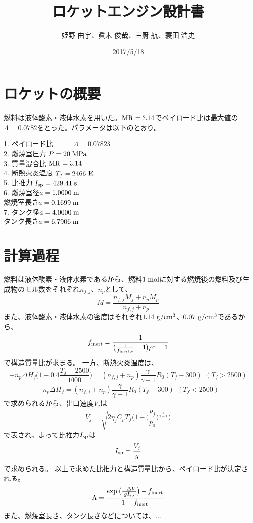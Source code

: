 \documentclass{jsarticle}
\begin{document}
\begin{titlepage}
\title{ロケットエンジン設計書}
\date{2017/5/18}
\author{姫野 由宇、眞木 俊哉、三厨 航、蓑田 浩史}
\maketitle
\thispagestyle{empty}
\end{titlepage}




\section{ロケットの概要}
燃料は液体酸素・液体水素を用いた。$\rm{MR}=3.14$でペイロード比は最大値の$\Lambda = 0.0782$をとった。パラメータは以下のとおり。

\begin{tabbing} 
1. \=ペイロード比 ~~~~ \= $\Lambda = 0.07823$\\

2. \>燃焼室圧力 \> $P = 20 ~\rm{MPa}$\\

3. \>質量混合比 \>$\rm{MR}=3.14$\\

4. \>断熱火炎温度 \>$T_f = 2466 ~ \rm{K}$\\

5. \>比推力 \>$I_{\rm{sp}}= 429.41~\rm{s}$\\

6. \>燃焼室径\>$a = 1.0000 ~ \rm{m}$\\

\>燃焼室長さ\>$a = 0.1699 ~ \rm{m}$\\

7. \>タンク径\>$a = 4.0000 ~ \rm{m}$\\

\>タンク長さ\>$a = 6.7906 ~ \rm{m}$\\
\end{tabbing} 

\section{計算過程}
燃料は液体酸素・液体水素であるから、燃料$1~\rm{mol}$に対する燃焼後の燃料及び生成物のモル数をそれぞれ$n_{f,j}$、$n_p$として、
\[
M = \frac{n_{f,j}M_f+n_pM_p}{n_{f,j}+n_p}
\]
また、液体酸素・液体水素の密度はそれぞれ$1.14 ~ \rm{g/cm^3}$、$0.07 ~ \rm{g/cm^3}$であるから、
\[
f_{\rm{inert}} = \frac{1}{\big(\frac{1}{f_{\rm{inert,s}}}-1\big)\rho^*+1}
\]
で構造質量比が求まる。
一方、断熱火炎温度は、
\[
-n_p\Delta H_f \Big( 1-0.4 \frac{T_f-2500}{1000} \Big) = (n_{f,j}+n_p)\frac{\gamma}{\gamma-1} R_0 (T_f-300) ~~ (T_f > 2500)
\]
\[
-n_p\Delta H_f = (n_{f,j}+n_p) \frac{\gamma}{\gamma-1} R_0 (T_f-300) ~~ (T_f < 2500)
\]
で求められるから、出口速度$V_j$は
\[
V_j = \sqrt{2\eta_j C_p T_f \Big( 1-\Big( \frac{p_j}{p_0}\Big)^{\frac{\gamma}{\gamma-1}} \Big)}
\]
で表され、よって比推力$I_{\rm{sp}}$は
\[
I_{\rm{sp}} = \frac{V_j}{g}
\]
で求められる。
以上で求めた比推力と構造質量比から、ペイロード比が決定される。
\[
\Lambda = \frac{\exp \big( {\frac{-\Delta V}{gI_{\rm{sp} } }}\big)-f_{\rm{inert}}}{1-f_{\rm{inert}}}
\]
また、燃焼室長さ、タンク長さなどについては、...
\end{document}
